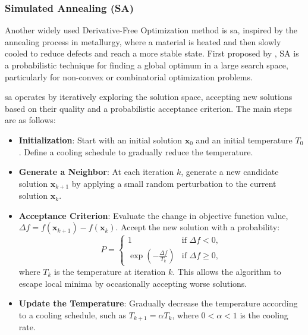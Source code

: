 \subsubsection{Simulated Annealing (SA)}
\label{subsubsection:simulated_annealing}
Another widely used Derivative-Free Optimization method is \ac{sa}, inspired by the annealing process in metallurgy, where a material is heated and then slowly cooled to reduce defects and reach a more stable state. First proposed by \citet{kirkpatrick1983optimization}, SA is a probabilistic technique for finding a global optimum in a large search space, particularly for non-convex or combinatorial optimization problems.

\ac{sa} operates by iteratively exploring the solution space, accepting new solutions based on their quality and a probabilistic acceptance criterion. The main steps are as follows:

\begin{itemize}
    \item \textbf{Initialization}: Start with an initial solution \(\mathbf{x}_0\) and an initial temperature \(T_0\). Define a cooling schedule to gradually reduce the temperature.
    
    \item \textbf{Generate a Neighbor}: At each iteration \(k\), generate a new candidate solution \(\mathbf{x}_{k+1}\) by applying a small random perturbation to the current solution \(\mathbf{x}_k\).
    
    \item \textbf{Acceptance Criterion}: Evaluate the change in objective function value, \(\Delta f = f(\mathbf{x}_{k+1}) - f(\mathbf{x}_k)\). Accept the new solution with a probability:
    \begin{equation}
    P = 
    \begin{cases} 
    1 & \text{if } \Delta f < 0, \\
    \exp\left(-\frac{\Delta f}{T_k}\right) & \text{if } \Delta f \geq 0,
    \end{cases}
    \end{equation}
    where \(T_k\) is the temperature at iteration \(k\). This allows the algorithm to escape local minima by occasionally accepting worse solutions.
    
    \item \textbf{Update the Temperature}: Gradually decrease the temperature according to a cooling schedule, such as \(T_{k+1} = \alpha T_k\), where \(0 < \alpha < 1\) is the cooling rate.
\end{itemize}

